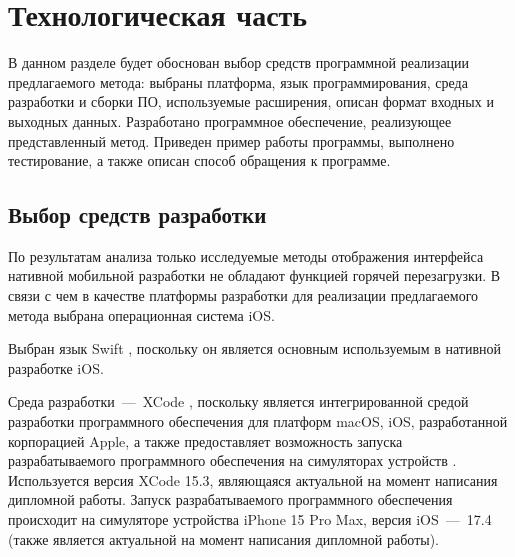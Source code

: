 \section{Технологическая часть}

В данном разделе будет обоснован выбор средств программной реализации предлагаемого метода: выбраны платформа, язык программирования, среда разработки и сборки ПО, используемые расширения, описан формат входных и выходных данных. 
Разработано программное обеспечение, реализующее представленный метод.
Приведен пример работы программы, выполнено тестирование, а также описан способ обращения к программе.

\subsection{Выбор средств разработки}

По результатам анализа только исследуемые методы отображения интерфейса нативной мобильной разработки не обладают функцией горячей перезагрузки. 
В связи с чем в качестве платформы разработки для реализации предлагаемого метода выбрана операционная система iOS.

Выбран язык Swift \cite{swift}, поскольку он является основным используемым в нативной разработке iOS.

Среда разработки~---~XCode \cite{xcode}, поскольку является интегрированной средой разработки программного обеспечения для платформ macOS, iOS, разработанной корпорацией Apple, а также предоставляет возможность запуска разрабатываемого программного обеспечения на симуляторах устройств \cite{simulator}. 
Используется версия XCode 15.3, являющаяся актуальной на момент написания дипломной работы.
Запуск разрабатываемого программного обеспечения происходит на симуляторе устройства iPhone 15 Pro Max, версия iOS~---~17.4 (также является актуальной на момент написания дипломной работы).

